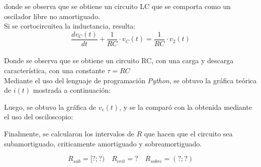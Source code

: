 \documentclass[a4paper]{article}
\begin{document}


donde se observa que se obtiene un circuito LC que se comporta como un oscilador libre no amortiguado.\\

Si se cortocircuitea la inductancia, resulta:
\begin{equation}
\frac{dv_{C}(t)}{dt}+\frac{1}{RC}\cdot v_{C}(t)=\frac{1}{RC}\cdot v_{2}(t)
\end{equation}\\
Donde se observa que se obtiene un circuito RC, con una carga y descarga característica, con una constante $\tau = RC$\\

Mediante el uso del lenguaje de programación \textit{Python}, se obtuvo la gráfica teórica de $i(t)$ mostrada a continuación:

Luego, se obtuvo la gráfica de $v_c(t)$, y se la comparó con la obtenida mediante el uso del osciloscopio:

Finalmente, se calcularon los intervalos de $R$ que hacen que el circuito sea subamortiguado, criticamente amortiguado y sobreamortiguado.

\[R_{sub}=[?;?) \quad R_{crit}= ? \quad R_{sobre}=(?;?)\]
\end{document}
